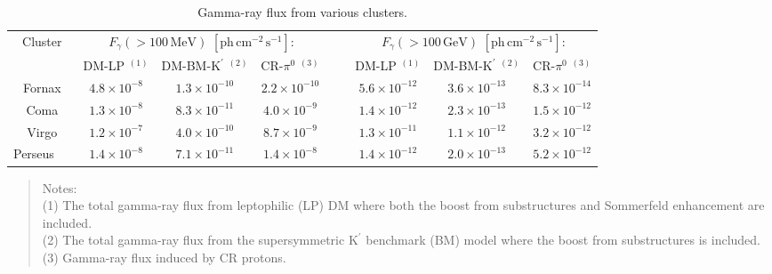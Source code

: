 \documentclass[10pt,aps,pra,reprint,amsmath,amsfonts,amssymb,showpacs,nofootinbib,floatfix]{revtex4-1}
\def\del#1{{}}
\newcommand{\rmn}{\mathrm}
\newcommand{\Kp}{\rmn{K}^\prime}
\newcommand{\rvir}{r_{200}}
\newcommand{\rhoc}{\ensuremath{\rho_c}}
\begin{document}
\begin{table}
\begin{minipage}{2.0\columnwidth}
  \caption{Gamma-ray flux from various clusters.}
\begin{tabular}{c  c c c  c  c c c}
\hline
\hline
 Cluster &
\multicolumn{3}{c}{$F_{\gamma}(>100\,\rmn{MeV})$ $[\rmn{ph}\,\rmn{cm}^{-2}\,\rmn{s}^{-1}]$:} & &
\multicolumn{3}{c}{$F_{\gamma}(>100\,\rmn{GeV})$ $[\rmn{ph}\,\rmn{cm}^{-2}\,\rmn{s}^{-1}]$:} \\
         & DM-LP $^{(1)}$ & DM-BM-$\Kp$ $^{(2)}$ & CR-$\pi^0$ $^{(3)}$ 
         & & DM-LP $^{(1)}$ & DM-BM-$\Kp$ $^{(2)}$ & CR-$\pi^0$ $^{(3)}$ \\
 \hline
Fornax               & $4.8\times10^{-8}$ & $1.3\times10^{-10}$ &  $2.2\times10^{-10}$ 
& \,\,\,\,\, & $5.6\times10^{-12}$  & $3.6\times10^{-13}$ & $8.3\times10^{-14}$ \\
Coma                 & $1.3\times10^{-8}$ & $8.3\times10^{-11}$ &  $4.0\times10^{-9}$  
& \,\,\,\,\, & $1.4\times10^{-12}$  & $2.3\times10^{-13}$ & $1.5\times10^{-12}$ \\
Virgo                & $1.2\times10^{-7}$ & $4.0\times10^{-10}$ &  $8.7\times10^{-9}$  
& \,\,\,\,\, & $1.3\times10^{-11}$  & $1.1\times10^{-12}$ & $3.2\times10^{-12}$ \\
Perseus \,\,\,\,\,\, & $1.4\times10^{-8}$ & $7.1\times10^{-11}$ &  $1.4\times10^{-8}$  
& \,\,\,\,\, & $1.4\times10^{-12}$  & $2.0\times10^{-13}$ & $5.2\times10^{-12}$ \\
\hline
\hline
\end{tabular}
\begin{quote}
 Notes: \\ 
 (1) The total gamma-ray flux from leptophilic (LP) DM where both the boost 
 from substructures and Sommerfeld enhancement are included.\\
 (2) The total gamma-ray flux from the supersymmetric $\Kp$ benchmark (BM) 
 model where the boost from substructures is included.\\
 (3) Gamma-ray flux induced by CR protons.
 \label{tab:flux_tab}
  \end{quote}
\end{minipage}
\end{table} 

\del{In this work we define the virial radius $\rvir$ of a halo to be
  the radius at which the mean density within is a factor $\Delta=200$
  times the critical density $\rhoc$ of the universe.}
\end{document}
